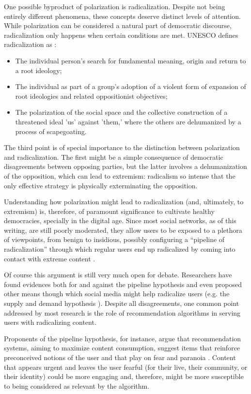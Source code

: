 One possible byproduct of polarization is radicalization. Despite not being
entirely different phenomena, these concepts deserve distinct levels of
attention. While polarization can be considered a natural part of democratic
discourse, radicalization only happens when certain conditions are met. UNESCO
defines radicalization as \citep{seraphin_youth_2017}:

\begin{itemize}
  \item The individual person's search for fundamental meaning, origin and
        return to a root ideology;
  \item The individual as part of a group's adoption of a violent form of
        expansion of root ideologies and related oppositionist objectives;
  \item The polarization of the social space and the collective construction of
        a threatened ideal 'us' against 'them,' where the others are dehumanized
        by a process of scapegoating.
\end{itemize}

The third point is of special importance to the distinction between polarization
and radicalization. The first might be a simple consequence of democratic
disagreements between opposing parties, but the latter involves a dehumanization
of the opposition, which can lead to extremism: radicalism so intense that the
only effective strategy is physically exterminating the opposition.

Understanding how polarization might lead to radicalization (and, ultimately, to
extremism) is, therefore, of paramount significance to cultivate healthy
democracies, specially in the digital age. Since most social networks, as of
this writing, are still poorly moderated, they allow users to be exposed to a
plethora of viewpoints, from benign to insidious, possibly configuring a
``pipeline of radicalization'' through which regular users end up radicalized by
coming into contact with extreme content \citep{}.

Of course this argument is still very much open for debate. Researchers have
found evidences both for and against \citep{} the pipeline hypothesis and even
proposed other means though which social media might help radicalize users (e.g.
the supply and demand hypothesis \citep{}). Despite all disagreements, one
common point addressed by most research is the role of recommendation algorithms
in serving users with radicalizing content.

Proponents of the pipeline hypothesis, for instance, argue that recommendation
systems, aiming to maximize content consumption, suggest items that reinforce
preconceived notions of the user and that play on fear and paranoia \citep{}.
Content that appears urgent and leaves the user fearful (for their live, their
community, or their identity) could be more engaging and, therefore, might be
more susceptible to being considered as relevant by the algorithm.

